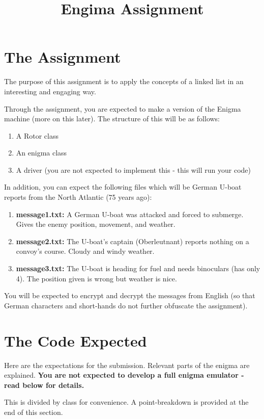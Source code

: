 \documentclass[11pt]{article}
\title{Engima Assignment}
\begin{document}
\maketitle

\section{The Assignment}

The purpose of this assignment is to apply the concepts of a linked list in an interesting and engaging way.

Through the assignment, you are expected to make a version of the Enigma machine (more on this later).
The structure of this will be as follows:
\begin{enumerate}
\item A Rotor class
\item An enigma class
\item A driver (you are not expected to implement this - this will run your code)
\end{enumerate}

In addition, you can expect the following files which will be German U-boat reports from the North Atlantic (75 years ago):
\begin{enumerate}
  \item \textbf{message1.txt:} A German U-boat was attacked and forced to submerge. Gives the enemy position, movement, and weather.
  \item \textbf{message2.txt:} The U-boat's captain (Oberleutnant) reports nothing on a convoy's course. Cloudy and windy weather.
  \item \textbf{message3.txt:} The U-boat is heading for fuel and needs binoculars (has only 4). The position given is wrong but weather is nice.
\end{enumerate}
You will be expected to encrypt and decrypt the messages from English
(so that German characters and short-hands do not further obfuscate the assignment).

\section{The Code Expected}
Here are the expectations for the submission. Relevant parts of the enigma are explained.
\textbf{You are not expected to develop a full enigma emulator - read below for details.}

This is divided by class for convenience. A point-breakdown is provided at the end of this section.
\end{document}
